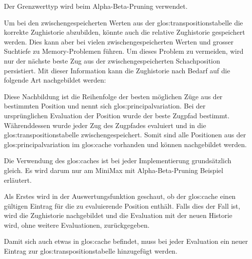\newpage

Der Grenzwerttyp wird beim Alpha-Beta-Pruning verwendet.


Um bei den zwischengespeicherten Werten aus der \gls{glos:transpositionstabelle} die korrekte Zughistorie abzubilden, könnte auch die relative Zughistorie gespeichert werden.
Dies kann aber bei vielen zwischengespeicherten Werten und grosser Suchtiefe zu Memory-Problemen führen.
Um dieses Problem zu vermeiden, wird nur der nächste beste Zug aus der zwischengespeicherten Schachposition persistiert.
Mit dieser Information kann die Zughistorie nach Bedarf auf die folgende Art nachgebildet werden:

Diese Nachbildung ist die Reihenfolge der besten möglichen Züge aus der bestimmten Position und nennt sich \gls{glos:principalvariation}.
Bei der ursprünglichen Evaluation der Position wurde der beste Zugpfad bestimmt.
Währenddessen wurde jeder Zug des Zugpfades evaluiert und in die \gls{glos:transpositionstabelle} zwischengespeichert.
Somit sind alle Positionen aus der \gls{glos:principalvariation} im \gls{glos:cache} vorhanden und können nachgebildet werden.

Die Verwendung des \glspl{glos:cache} ist bei jeder Implementierung grundsätzlich gleich.
Es wird darum nur am MiniMax mit Alpha-Beta-Pruning Beispiel erläutert.

\newpage

Als Erstes wird in der Auswertungsfunktion geschaut, ob der \gls{glos:cache} einen gültigen Eintrag für die zu evaluierende Position enthält.
Falls dies der Fall ist, wird die Zughistorie nachgebildet und die Evaluation mit der neuen Historie wird, ohne weitere Evaluationen, zurückgegeben.


Damit sich auch etwas in \gls{glos:cache} befindet, muss bei jeder Evaluation ein neuer Eintrag zur \gls{glos:transpositionstabelle} hinzugefügt werden.



